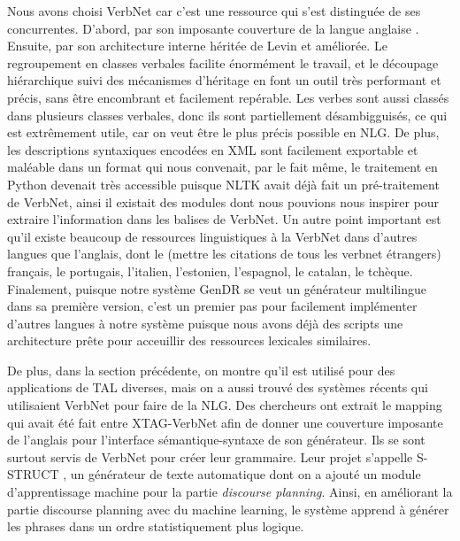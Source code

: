 Nous avons choisi VerbNet car c'est une ressource qui s'est distinguée de ses concurrentes. D'abord, par son imposante couverture de la langue anglaise . Ensuite, par son architecture interne héritée de Levin et améliorée. Le regroupement en classes verbales facilite énormément le travail, et le découpage hiérarchique suivi des mécanismes d'héritage en font un outil très performant et précis, sans être encombrant et facilement repérable. Les verbes sont aussi classés dans plusieurs classes verbales, donc ils sont partiellement désambigguisés, ce qui est extrêmement utile, car on veut être le plus précis possible en NLG. De plus, les descriptions syntaxiques encodées en XML sont facilement exportable et maléable dans un format qui nous convenait, par le fait même, le traitement en Python devenait très accessible puisque NLTK avait déjà fait un pré-traitement de VerbNet, ainsi il existait des modules dont nous pouvions nous inspirer pour extraire l'information dans les balises de VerbNet. Un autre point important est qu'il existe beaucoup de ressources linguistiques à la VerbNet dans d'autres langues que l'anglais, dont le (mettre les citations de tous les verbnet étrangers) français, le portugais, l'italien, l'estonien, l'espagnol, le catalan, le tchèque. Finalement, puisque notre système GenDR se veut un générateur multilingue dans sa première version, c'est un premier pas pour facilement implémenter d'autres langues à notre système puisque nous avons déjà des scripts une architecture prête pour acceuillir des ressources lexicales similaires. 

De plus, dans la section précédente, on montre qu'il est utilisé pour des applications de TAL diverses, mais on a aussi trouvé des systèmes récents qui utilisaient VerbNet pour faire de la NLG. Des chercheurs ont extrait le mapping qui avait été fait entre XTAG-VerbNet afin de donner une couverture imposante de l'anglais pour l'interface sémantique-syntaxe de son générateur. Ils se sont surtout servis de VerbNet pour créer leur grammaire. Leur projet s'appelle S-STRUCT \citep{PfeilAlgorithmsResourcesScalable2016}, un générateur de texte automatique dont on a ajouté un module d'apprentissage machine pour la partie \emph{discourse planning}. Ainsi, en améliorant la partie discourse planning avec du machine learning, le système apprend à générer les phrases dans un ordre statistiquement plus logique.

